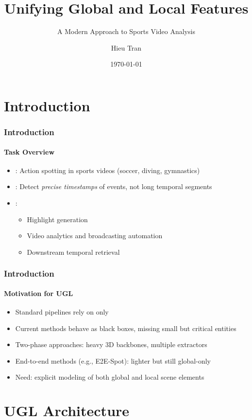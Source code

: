 \documentclass[aspectratio=169, lecture, amberg]{OTHAWbeamer}
\title[Action Spotting with UGL]
{Unifying Global and Local Features}
\subtitle{A Modern Approach to Sports Video Analysis}
\author[Presenter]{Hieu Tran}
\date{{\selectlanguage{english}\today}}
\begin{document}
\maketitle


\section{Introduction}

\begin{frame}
\frametitle{Introduction}
\framesubtitle{Task Overview}
\begin{itemize}
\item<1-> : Action spotting in sports videos (soccer, diving, gymnastics)
\item<2-> : Detect \textit{precise timestamps} of events, not long temporal segments
\item<3-> : 
	\begin{itemize}
	\item Highlight generation
	\item Video analytics and broadcasting automation
	\item Downstream temporal retrieval
	\end{itemize}
\end{itemize}
\end{frame}

\begin{frame}
\frametitle{Introduction}
\framesubtitle{Motivation for UGL}
\begin{itemize}
\item<1-> Standard pipelines rely on  only
\item<2-> Current methods behave as black boxes, missing small but critical entities
\item<3-> Two-phase approaches: heavy 3D backbones, multiple extractors
\item<4-> End-to-end methods (e.g., E2E-Spot): lighter but still global-only
\item<5-> \alert{Need}: explicit modeling of both global and local scene elements
\end{itemize}
\end{frame}

\section{UGL Architecture}
\end{document}

